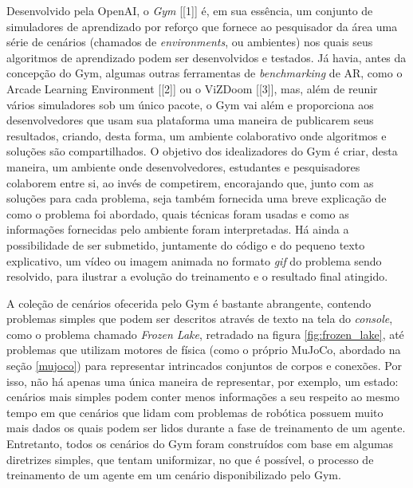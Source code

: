 \documentclass[cic,tc]{iiufrgs}
\begin{document}
%
%
Desenvolvido pela OpenAI, o \textit{Gym} [[1]] é, em sua essência, um conjunto
de simuladores de aprendizado por reforço que fornece ao pesquisador da área uma
série de cenários (chamados de \textit{environments}, ou ambientes) nos quais
seus algoritmos de aprendizado podem ser desenvolvidos e testados. Já havia,
antes da concepção do Gym, algumas outras ferramentas de \textit{benchmarking}
de AR, como o Arcade Learning Environment [[2]] ou o ViZDoom [[3]], mas, além de
reunir vários simuladores sob um único pacote, o Gym vai além e proporciona aos
desenvolvedores que usam sua plataforma uma maneira de publicarem seus
resultados, criando, desta forma, um ambiente colaborativo onde algoritmos
e soluções são compartilhados. O objetivo dos
idealizadores do Gym é criar, desta maneira, um ambiente onde desenvolvedores,
estudantes e pesquisadores colaborem entre si, ao invés de competirem,
encorajando que, junto com as soluções para cada problema, seja também fornecida
uma breve explicação de como o problema foi abordado, quais técnicas foram
usadas e como as informações fornecidas pelo ambiente foram interpretadas. Há
ainda a possibilidade de ser submetido, juntamente do código e do pequeno texto
explicativo, um vídeo ou imagem animada no formato \textit{gif} do problema
sendo resolvido, para ilustrar a evolução do treinamento e o resultado final
atingido.


A coleção de cenários ofecerida pelo Gym é bastante abrangente, contendo
problemas simples que podem ser descritos através de texto na tela do
\textit{console}, como  o problema chamado \textit{Frozen Lake}, retradado na
figura \ref{fig:frozen_lake}, até problemas que utilizam motores de física (como
o próprio MuJoCo, abordado na seção \ref{mujoco}) para representar intrincados
conjuntos de corpos e conexões. Por isso, não há apenas uma única maneira de
representar, por exemplo, um estado: cenários mais simples podem conter menos
informações a seu respeito ao mesmo tempo em que cenários que lidam com
problemas de robótica possuem muito mais dados os quais podem ser lidos durante
a fase de treinamento de um agente. Entretanto, todos os cenários do Gym foram
construídos com base em algumas diretrizes simples, que tentam uniformizar, no
que é possível, o processo de treinamento de um agente em um cenário
disponibilizado pelo Gym.
\end{document}
